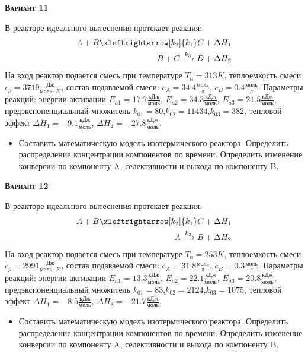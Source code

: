 \textsc{\textbf{Вариант 11}}

 В реакторе идеального вытеснения протекает реакция: \begin{equation*} \begin{aligned} A+B \xleftrightarrow[k_2]{k_1} C + \Delta H_1 \\ B + C \xrightarrow{k_3} D + \Delta H_2 \end{aligned} \end{equation*}                        На вход  реактор подается смесь при температуре $ T_{н} =  313 K$, теплоемкость смеси $c_p= 3719 \frac{Дж}{моль \cdot K}$, состав подаваемой смеси: $c_A=34.4 \frac{моль}{л}$, $c_B=0.4 \frac{моль}{л}$. Параметры реакций: энергии активации $E_{a1}=17.7 \frac{кДж}{моль}$, $E_{a2}=34.3  \frac{кДж}{моль}$, $E_{a3}=21.5  \frac{кДж}{моль}$, предэкспоненциальный множитель $k_{01}=        80$,$k_{02}=     11434$,$k_{03}=       382$, тепловой эффект $\Delta H_1= -9.1  \frac{кДж}{моль}$, $\Delta H_2=-27.8 \frac{кДж}{моль}$.\begin{itemize} \item Составить математическую модель изотермического реактора. Определить распределение концентрации компонентов по времени. Определить изменение конверсии по компоненту A, селективности и выхода по компоненту B. \end{itemize}

\textsc{\textbf{Вариант 12}}

 В реакторе идеального вытеснения протекает реакция: \begin{equation*} \begin{aligned} A+B \xleftrightarrow[k_2]{k_1} C +\Delta H_1 \\ A \xrightarrow{k_3} B + \Delta H_2 \end{aligned} \end{equation*}                             На вход  реактор подается смесь при температуре $ T_{н} =  253 K$, теплоемкость смеси $c_p= 2991 \frac{Дж}{моль \cdot K}$, состав подаваемой смеси: $c_A=31.8 \frac{моль}{л}$, $c_B=0.3 \frac{моль}{л}$. Параметры реакций: энергии активации $E_{a1}=13.3 \frac{кДж}{моль}$, $E_{a2}=22.1  \frac{кДж}{моль}$, $E_{a3}=20.8  \frac{кДж}{моль}$, предэкспоненциальный множитель $k_{01}=        83$,$k_{02}=      2124$,$k_{03}=      1075$, тепловой эффект $\Delta H_1= -8.5  \frac{кДж}{моль}$, $\Delta H_2=-21.7 \frac{кДж}{моль}$.\begin{itemize} \item Составить математическую модель изотермического реактора. Определить распределение концентрации компонентов по времени. Определить изменение конверсии по компоненту A, селективности и выхода по компоненту B. \end{itemize}

